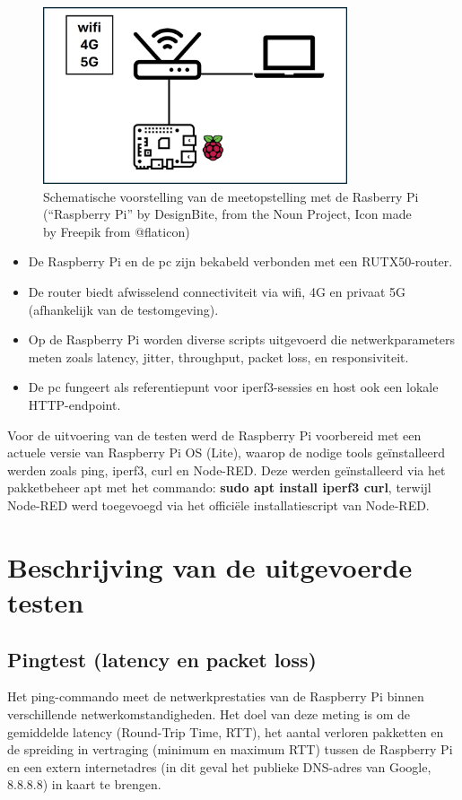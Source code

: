 \begin{figure}
    \includegraphics[width=0.8\textwidth]{../graphics/Opstelling_1.jpg}
    \caption[Schematische voorstelling van de meetopstelling met de Rasberry Pi (“Raspberry Pi” by DesignBite, from the Noun Project, Icon made by Freepik from @flaticon)]{\label{fig:opstellingpi}Schematische voorstelling van de meetopstelling met de Rasberry Pi (“Raspberry Pi” by DesignBite, from the Noun Project, Icon made by Freepik from @flaticon)}
\end{figure}
\begin{itemize}
    \item De Raspberry Pi en de pc zijn bekabeld verbonden met een RUTX50-router.
    \item De router biedt afwisselend connectiviteit via wifi, 4G en privaat 5G (afhankelijk van de testomgeving).
    \item Op de Raspberry Pi worden diverse scripts uitgevoerd die netwerkparameters meten zoals latency, jitter, throughput, packet loss, en responsiviteit.
    \item De pc fungeert als referentiepunt voor iperf3-sessies en host ook een lokale HTTP-endpoint.
\end{itemize}

Voor de uitvoering van de testen werd de Raspberry Pi voorbereid met een actuele versie van Raspberry Pi OS (Lite), waarop de nodige tools geïnstalleerd werden zoals ping, iperf3, curl en Node-RED. Deze werden geïnstalleerd via het pakketbeheer apt met het commando: \textbf{sudo apt install iperf3 curl}, terwijl Node-RED werd toegevoegd via het officiële installatie­script van Node-RED.

\section{Beschrijving van de uitgevoerde testen}

\subsection{Pingtest (latency en packet loss)}
Het ping-commando meet de netwerkprestaties van de Raspberry Pi binnen verschillende netwerkomstandigheden. Het doel van deze meting is om de gemiddelde latency (Round-Trip Time, RTT), het aantal verloren pakketten en de spreiding in vertraging (minimum en maximum RTT) tussen de Raspberry Pi en een extern internetadres (in dit geval het publieke DNS-adres van Google, 8.8.8.8) in kaart te brengen.

